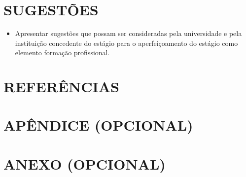 \documentclass[12pt]{article}
\begin{document}
\section{SUGESTÕES}
{\color{red}
\begin{justify}
    \begin{itemize}
        \item Apresentar sugestões que possam ser consideradas pela universidade e pela instituição concedente do estágio para o aperfeiçoamento do estágio como elemento formação profissional.

    \end{itemize}
\end{justify}
}
\nocite{*}

\section*{REFERÊNCIAS}



\appendix
\section*{APÊNDICE {\color{red}(OPCIONAL)}}

\section*{ANEXO {\color{red}(OPCIONAL)}}
\end{document}
